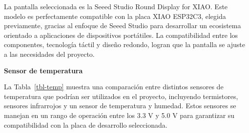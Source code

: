\documentclass[
  letterpaper,
  DIV=11,
  numbers=noendperiod]{scrreport}
\begin{document}
La pantalla seleccionada es la Seeed Studio Round Display for XIAO. Este
modelo es perfectamente compatible con la placa XIAO ESP32C3, elegida
previamente, gracias al enfoque de Seeed Studio para desarrollar un
ecosistema orientado a aplicaciones de dispositivos portátiles. La
compatibilidad entre los componentes, tecnología táctil y diseño
redondo, logran que la pantalla se ajuste a las necesidades del
proyecto.

\textbf{Sensor de temperatura}

La Tabla~\ref{tbl-temp} muestra una comparación entre distintos sensores
de temperatura que podrían ser utilizados en el proyecto, incluyendo
termistores, sensores infrarrojos y un sensor de temperatura y humedad.
Estos sensores se manejan en un rango de operación entre los 3.3 V y 5.0
V para garantizar su compatibilidad con la placa de desarrollo
seleccionada.
\end{document}
